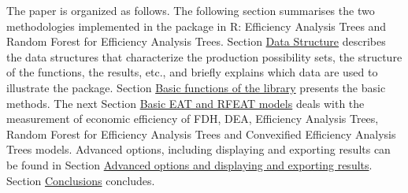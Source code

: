 The paper is organized as follows. The following section summarises the
two methodologies implemented in the  package in R: Efficiency
Analysis Trees and Random Forest for Efficiency Analysis Trees. Section
\protect\hyperlink{section3}{Data Structure} describes the data
structures that characterize the production possibility sets, the
structure of the functions, the results, etc., and briefly explains
which data are used to illustrate the package. Section
\protect\hyperlink{section4}{Basic functions of the library} presents
the basic methods. The next Section \protect\hyperlink{section5}{Basic
EAT and RFEAT models} deals with the measurement of economic efficiency
of FDH, DEA, Efficiency Analysis Trees, Random Forest for Efficiency
Analysis Trees and Convexified Efficiency Analysis Trees models.
Advanced options, including displaying and exporting results can be
found in Section \protect\hyperlink{section6}{Advanced options and
displaying and exporting results}. Section
\protect\hyperlink{section7}{Conclusions} concludes.

